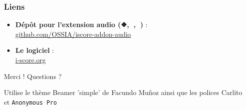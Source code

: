 \documentclass{beamer}
\begin{document}
\begin{frame}
    \frametitle{Liens} 
    \Large
    \begin{itemize}
        \setlength\itemsep{1em}
        \item \textbf{Dépôt pour l'extension audio ({\unicodefun ❖, 🍎, 🐧})} :~\\
        \url{github.com/OSSIA/iscore-addon-audio}
        \item \textbf{Le logiciel} :~\\
         \url{i-score.org}
    \end{itemize}
        
    \centering
    \vspace{2em}
    \Large{Merci ! Questions ?}
    \vspace{2em}
    
    \tiny{Utilise le thème Beamer 'simple' de Facundo Muñoz ainsi que les polices Carlito et \texttt{Anonymous Pro}}
\end{frame}    

\begin{frame}
	
	
\end{frame}
\end{document}
